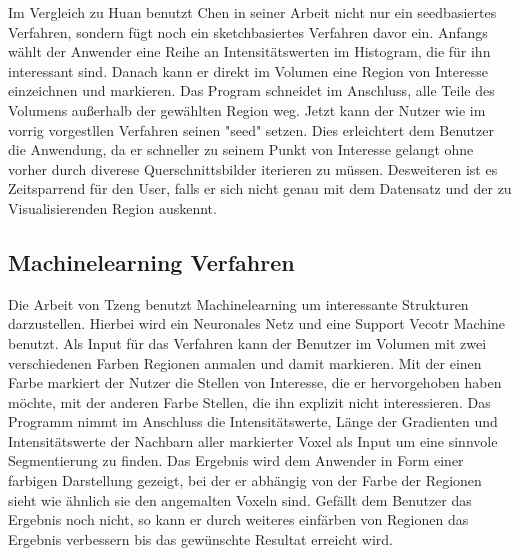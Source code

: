 Im Vergleich zu Huan \cite{huang2003rgvis} benutzt Chen  in seiner Arbeit \cite{chen2006sketch} nicht nur ein seedbasiertes Verfahren, sondern fügt noch ein sketchbasiertes Verfahren davor ein.
\newline
Anfangs wählt der Anwender eine Reihe an Intensitätswerten im Histogram, die für ihn interessant sind. Danach kann er direkt im Volumen eine Region von Interesse einzeichnen und markieren. Das Program schneidet im Anschluss, alle Teile des Volumens außerhalb der gewählten Region weg. Jetzt kann der Nutzer wie im vorrig vorgestllen Verfahren seinen "seed" setzen.
\newline
Dies erleichtert dem Benutzer die Anwendung, da er schneller zu seinem Punkt von Interesse gelangt ohne vorher durch diverese Querschnittsbilder iterieren zu müssen. Desweiteren ist es Zeitsparrend für den User, falls er sich nicht genau mit dem Datensatz und der zu Visualisierenden Region auskennt.





\subsection{Machinelearning Verfahren}

Die Arbeit von Tzeng \cite{tzeng2005intelligent} benutzt Machinelearning um interessante Strukturen darzustellen. Hierbei wird ein Neuronales Netz und eine Support Vecotr Machine benutzt.
\newline
Als Input für das Verfahren kann der Benutzer im Volumen mit zwei verschiedenen Farben Regionen anmalen und damit markieren. Mit der einen Farbe markiert der Nutzer die Stellen von Interesse, die er hervorgehoben haben möchte, mit der anderen Farbe Stellen, die ihn explizit nicht interessieren. Das Programm nimmt im Anschluss die Intensitätswerte, Länge der Gradienten und Intensitätswerte der Nachbarn aller markierter Voxel als Input um eine sinnvole Segmentierung zu finden. Das Ergebnis wird dem Anwender in Form einer farbigen Darstellung gezeigt, bei der er abhängig von der Farbe der Regionen sieht wie ähnlich sie den angemalten Voxeln sind. Gefällt dem Benutzer das Ergebnis noch nicht, so kann er durch weiteres einfärben von Regionen das Ergebnis verbessern bis das gewünschte Resultat erreicht wird.



